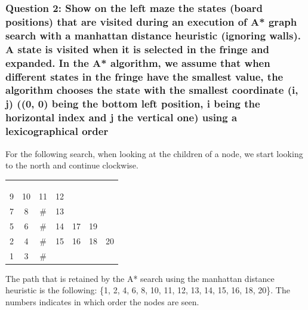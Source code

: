 \documentclass[a4paper,10pt]{article}
\begin{document}
			\subsubsection{Question 2: Show on the left maze the states (board positions) that are visited during an execution of A* graph search with a manhattan distance heuristic (ignoring walls). A state is visited when it is selected in the fringe and expanded. In the A* algorithm, we assume that when different states in the fringe have the smallest value, the algorithm chooses the state with the smallest coordinate (i, j) ((0, 0) being the bottom left position, i being the horizontal index and j the vertical one) using a lexicographical order}
				For the following search, when looking at the children of a node, we start looking to the north and continue clockwise.\\
			\begin{center}
				\begin{tabular}{|c|c|c|c|c|c|c|}
					\hline 
					  &    &    &    &    &    &   \\ 
					\hline 
					  &    &    &    &    &    &   \\ 
					\hline 
					  &    &    &    &    &    &   \\ 
					\hline 
					  &    &    &    &    &    &   \\ 
					\hline 
					9 & 10 & 11 & 12 &    &    &   \\ 
					\hline 
					7 & 8  & \# & 13 &    &    &   \\ 
					\hline 
					5 & 6  & \# & 14 & 17 & 19 &   \\ 
					\hline 
					2 & 4  & \# & 15 & 16 & 18 & 20 \\ 
					\hline 
					1 & 3  & \# &    &    &    &   \\ 
					\hline 
				\end{tabular}
			\end{center} 
				The path that is retained by the A* search using the manhattan distance heuristic is the following: \{1, 2, 4, 6, 8, 10, 11, 12, 13, 14, 15, 16, 18, 20\}. The numbers indicates in which order the nodes are seen.
\end{document}
